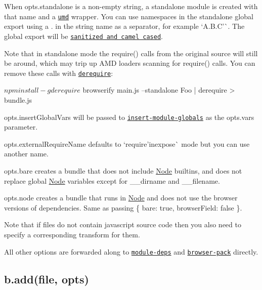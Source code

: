 When {\ttfamily opts.\+standalone} is a non-\/empty string, a standalone module is created with that name and a \href{https://github.com/forbeslindesay/umd}{\tt umd} wrapper. You can use namespaces in the standalone global export using a {\ttfamily .} in the string name as a separator, for example `\textquotesingle{}A.\+B.\+C'\`{}. The global export will be \href{https://github.com/ForbesLindesay/umd#name-casing-and-characters}{\tt sanitized and camel cased}.

Note that in standalone mode the {\ttfamily require()} calls from the original source will still be around, which may trip up A\+MD loaders scanning for {\ttfamily require()} calls. You can remove these calls with \href{https://www.npmjs.com/package/derequire}{\tt derequire}\+:


\begin{DoxyCode}
$ npm install -g derequire
$ browserify main.js --standalone Foo | derequire > bundle.js
\end{DoxyCode}


{\ttfamily opts.\+insert\+Global\+Vars} will be passed to \href{https://www.npmjs.com/package/insert-module-globals}{\tt insert-\/module-\/globals} as the {\ttfamily opts.\+vars} parameter.

{\ttfamily opts.\+external\+Require\+Name} defaults to `\textquotesingle{}require'{\ttfamily in}expose\`{} mode but you can use another name.

{\ttfamily opts.\+bare} creates a bundle that does not include \mbox{\hyperlink{classNode}{Node}} builtins, and does not replace global \mbox{\hyperlink{classNode}{Node}} variables except for {\ttfamily \+\_\+\+\_\+dirname} and {\ttfamily \+\_\+\+\_\+filename}.

{\ttfamily opts.\+node} creates a bundle that runs in \mbox{\hyperlink{classNode}{Node}} and does not use the browser versions of dependencies. Same as passing {\ttfamily \{ bare\+: true, browser\+Field\+: false \}}.

Note that if files do not contain javascript source code then you also need to specify a corresponding transform for them.

All other options are forwarded along to \href{https://www.npmjs.com/package/module-deps}{\tt module-\/deps} and \href{https://www.npmjs.com/package/browser-pack}{\tt browser-\/pack} directly.

\subsection*{b.\+add(file, opts)}

